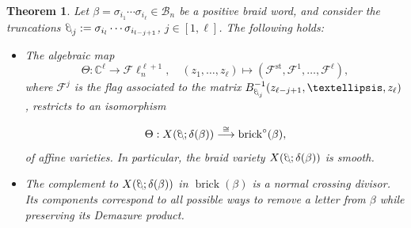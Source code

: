 \documentclass[10pt]{amsart}
\theoremstyle{plain}
\newtheorem{thm}{Theorem}[section]
\theoremstyle{definition}
\theoremstyle{remark}
\numberwithin{equation}{section}
\newcommand{\lr}{\longrightarrow}
\newcommand{\std}{\text{st}}
\newcommand{\bC}{\mathbb{C}}
\newcommand{\cB}{\mathcal{B}}
\newcommand{\cF}{\mathscr{F}}
\newcommand{\Fl}{\mathscr{F}\ell}
\newcommand{\brick}{\operatorname{brick}}
\newcommand{\MG}[1]{{\color{teal}{{\bf Misha}: #1}}}
\DeclareRobustCommand{\ateb}{\text{\reflectbox{$\beta$}}}
\begin{document}
\begin{thm}\label{prop:brick} Let $\beta = \sigma_{i_{1}}\cdots\sigma_{i_{\ell}}\in\cB_n$ be a positive braid word, and consider the truncations $\ateb_{j} := \sigma_{i_{l}}\cdots \sigma_{i_{l-j+1}}$, $j\in[1,\ell]$.%
The following holds:
	
	\begin{itemize}
		\item[$(i)$] The algebraic map
		$$\Theta:\bC^{\ell}\lr\Fl_n^{\ell+1},\quad (z_1, \dots, z_{\ell}) \mapsto (\cF^{\std}, \cF^{1}, \dots, \cF^{\ell}),$$
		where $\cF^{j}$ is the flag associated to the matrix $B_{\ateb_{j}}^{-1}(z_{\ell - j + 1}, \dots, z_{\ell})$, restricts to an isomorphism
		
		$$\Theta:	X(\ateb; \delta(\beta)) \stackrel{\cong}{\lr} \brick^{\circ}(\beta),$$
		of affine varieties. In particular, the braid variety $X(\ateb; \delta(\beta))$ is smooth.\\
		
		\item[$(ii)$] %
The complement to $X(\ateb; \delta(\beta))$ in $\brick(\beta)$ is a normal crossing divisor. Its components correspond to all possible ways to remove a letter from $\beta$ while preserving its Demazure product.
	\end{itemize}
\end{thm}
\end{document}
